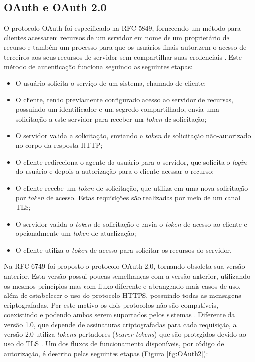 \subsection{OAuth e OAuth 2.0}

O protocolo OAuth foi especificado na RFC 5849, fornecendo um método para clientes acessarem 
recursos de um servidor em nome de um proprietário de recurso e também um processo para que os 
usuários finais autorizem o acesso de terceiros aos seus recursos de servidor sem compartilhar suas
credenciais \cite{RFC5849}. Este método de autenticação funciona seguindo as seguintes etapas:

\begin{itemize}
\item O usuário solicita o serviço de um sistema, chamado de cliente;
\item O cliente, tendo previamente configurado acesso ao servidor de recursos, possuindo um 
identificador e um segredo compartilhado, envia uma solicitação a este servidor para receber um 
\emph{token} de solicitação;
\item O servidor valida a solicitação, enviando o \emph{token} de solicitação não-autorizado no 
corpo da resposta HTTP;
\item O cliente redireciona o agente do usuário para o servidor, que solicita o \emph{login} do 
usuário e depois a autorização para o cliente acessar o recurso;
\item O cliente recebe um \emph{token} de solicitação, que utiliza em uma nova solicitação por 
\emph{token} de acesso. Estas requisições são realizadas por meio de um canal TLS;
\item O servidor valida o \emph{token} de solicitação e envia o \emph{token} de acesso ao cliente e 
opcionalmente um \emph{token} de atualização;
\item O cliente utiliza o \emph{token} de acesso para solicitar os recursos do servidor.
\end{itemize}

Na RFC 6749 foi proposto o protocolo OAuth 2.0, tornando obsoleta sua versão anterior. Esta versão possui 
poucas semelhanças com a versão anterior, utilizando os mesmos princípios mas com fluxo diferente e 
abrangendo mais casos de uso, além de estabelecer o uso do protocolo HTTPS, possuindo todas as mensagens 
criptografadas. Por este motivo os dois protocolos não são compatíveis, coexistindo e podendo ambos serem 
suportados pelos sistemas \cite{RFC6749}. Diferente da versão 1.0, que depende de assinaturas 
criptografadas para cada requisição, a versão 2.0 utiliza \emph{tokens} portadores (\emph{bearer tokens}) 
que são protegidos devido ao uso do TLS \cite{SIRIWARDENA2014}. Um dos fluxos de funcionamento 
disponíveis, por código de autorização, é descrito pelas seguintes etapas (Figura \ref{fig:OAuth2}):

